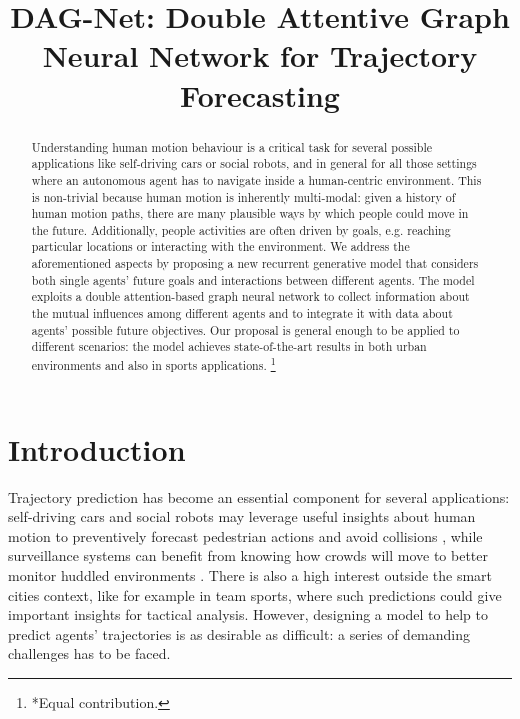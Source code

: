 \documentclass[10pt,a4paper,conference]{IEEEtran}
\newcommand\blfootnote[1]{\begingroup
  \renewcommand\thefootnote{}\footnote{#1}\addtocounter{footnote}{-1}\endgroup
}
\begin{document}
\title{DAG-Net: Double Attentive Graph Neural Network for Trajectory Forecasting}

\author{
}














\maketitle

\begin{abstract}

Understanding human motion behaviour is a critical task for several possible applications like self-driving cars or social robots, and in general for all those settings where an autonomous agent has to navigate inside a human-centric environment. This is non-trivial because human motion is inherently multi-modal: given a history of human motion paths, there are many plausible ways by which people could move in the future. Additionally, people activities are often driven by goals, e.g. reaching particular locations or interacting with the environment. We address the aforementioned aspects by proposing a new recurrent generative model that considers both single agents' future goals and interactions between different agents. The model exploits a double attention-based graph neural network to collect information about the mutual influences among different agents and to integrate it with data about agents' possible future objectives. Our proposal is general enough to be applied to different scenarios: the model achieves state-of-the-art results in both urban environments and also in sports applications. \blfootnote{*Equal contribution.}
\end{abstract} 

\IEEEpeerreviewmaketitle

\section{Introduction}
Trajectory prediction has become an essential component for several applications: self-driving cars and social robots may leverage useful insights about human motion to preventively forecast pedestrian actions and avoid collisions \cite{forecasting_interactive_dynamics, multi_agents_fusion, glmp-realtime, goal_robots}, while surveillance systems can benefit from knowing how crowds will move to better monitor huddled environments \cite{surveillance_1, abnormal_crowd}. There is also a high interest outside the smart cities context, like for example in team sports, where such predictions could give important insights for tactical analysis. However, designing a model to help to predict agents' trajectories is as desirable as difficult: a series of demanding challenges has to be faced.
\end{document}
